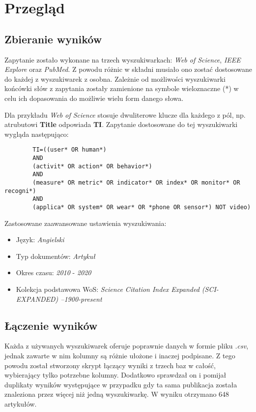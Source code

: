 \section{Przegląd}

\subsection{Zbieranie wyników}
Zapytanie zostało wykonane na trzech wyszukiwarkach: \textit{Web of Science}, \textit{IEEE Explore} oraz \textit{PubMed}. Z powodu różnic w składni musiało ono zostać dostosowane do każdej z wyszukiwarek z osobna. Zależnie od możliwości wyszukiwarki końcówki słów z zapytania zostały zamienione na symbole wieloznaczne (*) w celu ich dopasowania do możliwie wielu form danego słowa.

Dla przykładu \textit{Web of Science} stosuje dwuliterowe klucze dla każdego z pól, np. atrubutowi {\bf Title} odpowiada {\bf TI}. Zapytanie dostosowane do tej wyszukiwarki wygląda następująco:
\begin{center}
	\begin{minipage}{0.85\linewidth}
		\begin{verbatim}
		TI=((user* OR human*) 
		AND 
		(activit* OR action* OR behavior*)
		AND 
		(measure* OR metric* OR indicator* OR index* OR monitor* OR recogni*) 
		AND 
		(applica* OR system* OR wear* OR *phone OR sensor*) NOT video)
		\end{verbatim}
	\end{minipage}
\end{center}
Zastosowane zaawansowane ustawienia wyszukiwania:
\begin{itemize}
    \item Język: {\it Angielski}
    \item Typ dokumentów: {\it Artykuł}
    \item Okres czasu: {\it 2010} - {\it 2020}
    \item Kolekcja podstawowa WoS: {\it Science Citation Index Expanded (SCI-EXPANDED) --1900-present}
\end{itemize}

\subsection{Łączenie wyników}
Każda z używanych wyszukiwarek oferuje poprawnie danych w formie pliku {\it .csv}, jednak zawarte w nim kolumny są różnie ułożone i inaczej podpisane. Z tego powodu został stworzony skrypt łączący wyniki z trzech baz w całość, wybierający tylko potrzebne kolumny. Dodatkowo sprawdzał on i pomijał duplikaty wyników występujące w przypadku gdy ta sama publikacja została znaleziona przez więcej niż jedną wyszukiwarkę. W wyniku otrzymano 648 artykułów.

